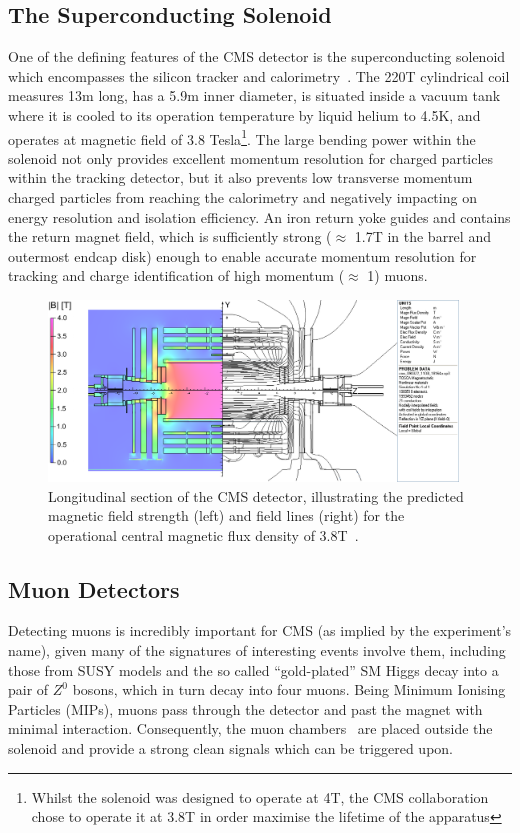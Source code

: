\subsection{The Superconducting Solenoid}\label{subsec:magnet}
One of the defining features of the CMS detector is the superconducting solenoid which encompasses the silicon tracker and calorimetry~\cite{Acquistapace:1997fm,Herve:2000}.
The 220T cylindrical coil measures 13m long, has a 5.9m inner diameter, is situated inside a vacuum tank where it is cooled to its operation temperature by liquid helium to 4.5K, and operates at magnetic field of 3.8 Tesla\footnote{Whilst the solenoid was designed to operate at 4T, the CMS collaboration chose to operate it at 3.8T in order maximise the lifetime of the apparatus}.
The large bending power within the solenoid not only provides excellent momentum resolution for charged particles within the tracking detector, but it also prevents low transverse momentum charged particles from reaching the calorimetry and negatively impacting on energy resolution and isolation efficiency.
An iron return yoke guides and contains the return magnet field, which is sufficiently strong ($\approx$ 1.7T in the barrel and outermost endcap disk) enough to enable accurate momentum resolution for tracking and charge identification of high momentum ($\approx$ 1\TeVc) muons.

\begin{figure}[htbp]
\begin{center}
\includegraphics[width=0.97\textwidth]{figs/cms/cms_magnetic_field.png}
\caption{Longitudinal section of the CMS detector, illustrating the predicted magnetic field strength (left) and field lines (right) for the operational central magnetic flux density of 3.8T~\cite{Chatrchyan:2009si}.}
\label{fig:magneticField}
\end{center}
\end{figure}

\subsection{Muon Detectors}\label{subsec:muon chambers}
Detecting muons is incredibly important for CMS (as implied by the experiment’s name), given many of the signatures of interesting events involve them, including those from SUSY models and the so called “gold-plated” SM Higgs decay into a pair of $Z^{0}$ bosons, which in turn decay into four muons. 
Being Minimum Ionising Particles (MIPs), muons pass through the detector and past the magnet with minimal interaction.
Consequently, the muon chambers~\cite{CMS:1997iti} are placed outside the solenoid and provide a strong clean signals which can be triggered upon.

